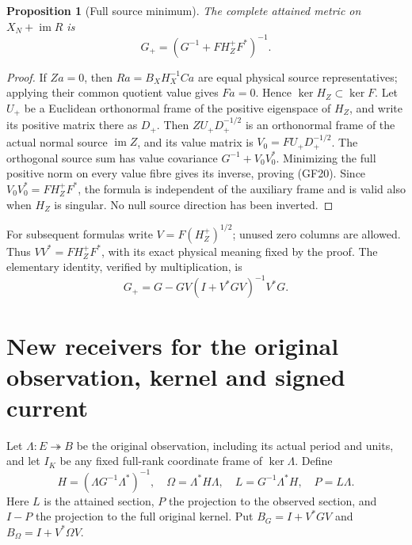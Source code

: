 \documentclass[11pt]{article}
\newcommand{\im}{\operatorname{im}}
\newtheorem{proposition}[theorem]{Proposition}
\begin{document}
\begin{proposition}[Full source minimum]
The complete attained metric on $X_N+\im R$ is
\[
G_+=(G^{-1}+F H_Z^+F^*)^{-1}.
\tag{GF20}
\]
\end{proposition}
\begin{proof}
If $Za=0$, then $Ra=B_XH_X^{-1}Ca$ are equal physical source
representatives; applying their common quotient value gives $Fa=0$.
Hence $\ker H_Z\subset\ker F$. Let $U_+$ be a Euclidean orthonormal
frame of the positive eigenspace of $H_Z$, and write its positive
matrix there as $D_+$. Then $Z U_+D_+^{-1/2}$ is an orthonormal frame
of the actual normal source $\im Z$, and its value matrix is
$V_0=F U_+D_+^{-1/2}$. The orthogonal source sum has value covariance
$G^{-1}+V_0V_0^*$. Minimizing the full positive norm on every value
fibre gives its inverse, proving (GF20). Since
$V_0V_0^*=F H_Z^+F^*$, the formula is independent of the auxiliary
frame and is valid also when $H_Z$ is singular. No null source direction
has been inverted.
\end{proof}

For subsequent formulas write $V=F(H_Z^+)^{1/2}$; unused zero columns
are allowed. Thus $VV^*=F H_Z^+F^*$, with its exact physical meaning
fixed by the proof. The elementary identity, verified by multiplication,
is
\[
G_+=G-GV(I+V^*GV)^{-1}V^*G.
\tag{GF21}
\]

\section{New receivers for the original observation, kernel and signed current}
Let $\Lambda:E\twoheadrightarrow B$ be the original observation,
including its actual period and units, and let $I_K$ be any fixed
full-rank coordinate frame of $\ker\Lambda$. Define
\[
H=(\Lambda G^{-1}\Lambda^*)^{-1},\quad
\Omega=\Lambda^*H\Lambda,\quad
L=G^{-1}\Lambda^*H,\quad P=L\Lambda.
\tag{GF22}
\]
Here $L$ is the attained section, $P$ the projection to the observed
section, and $I-P$ the projection to the full original kernel. Put
$B_G=I+V^*GV$ and $B_\Omega=I+V^*\Omega V$.
\end{document}
